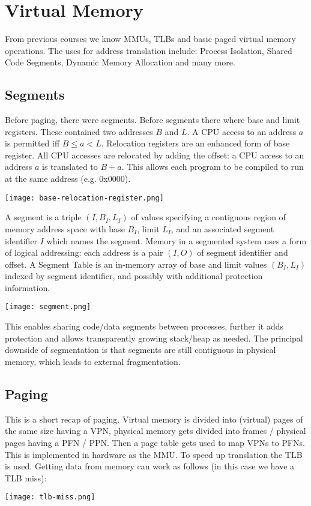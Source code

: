 \section{Virtual Memory}

From previous courses we know MMUs, TLBs and basic paged virtual memory operations. The uses for address translation include: Process Isolation, Shared Code Segments, Dynamic Memory Allocation and many more.


\subsection{Segments}

Before paging, there were segments. Before segments there where base and limit registers. These contained two addresses $B$ and $L$. A CPU access to an address $a$ is permitted iff $B \leq a < L$. Relocation registers are an enhanced form of base register. All CPU accesses are relocated by adding the offset: a CPU access to an address $a$ is translated to $B + a$. This allows each program to be compiled to run at the same address (e.g. 0x0000). \medskip
\begin{center}
	\texttt{[image: base-relocation-register.png]}
\end{center}

A segment is a triple $(I, B_I, L_I)$ of values specifying a contiguous region of memory address space with base $B_I$, limit $L_I$, and an associated segment identifier $I$ which names the segment. Memory in a segmented system uses a form of logical addressing: each address is a pair $(I, O)$ of segment identifier and offset. A Segment Table is an in-memory array of base and limit values $(B_I, L_I)$ indexed by segment identifier, and possibly with additional protection information.
\begin{center}
	\texttt{[image: segment.png]}
\end{center}

This enables sharing code/data segments between processes, further it adds protection and allows transparently growing stack/heap as needed. The principal downside of segmentation is that segments are still contiguous in physical memory, which leads to external fragmentation.


\subsection{Paging}

This is a short recap of paging. Virtual memory is divided into (virtual) pages of the same size having a VPN, physical memory gets divided into frames / physical pages having a PFN / PPN. Then a page table gets used to map VPNs to PFNs. This is implemented in hardware as the MMU. To speed up translation the TLB is used. Getting data from memory can work as follows (in this case we have a TLB miss):
\begin{center}
	\texttt{[image: tlb-miss.png]}
\end{center}


